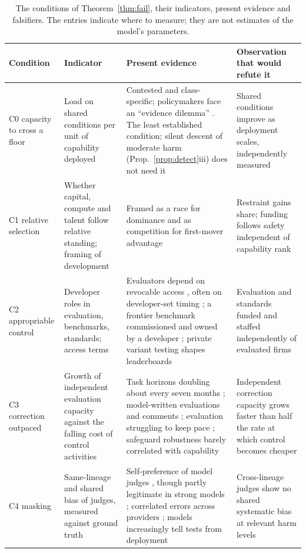 \documentclass[letterpaper]{article} %
\theoremstyle{definition}
\begin{document}
\begin{table}[t]
\centering
\small
\setlength{\tabcolsep}{4pt}
\begin{tabular}{@{}>{\raggedright\arraybackslash}p{2.6cm}>{\raggedright\arraybackslash}p{4.2cm}>{\raggedright\arraybackslash}p{5.6cm}>{\raggedright\arraybackslash}p{4.4cm}@{}}
\toprule
Condition & Indicator & Present evidence & Observation that would refute it \\
\midrule
C0 capacity to cross a floor & Load on shared conditions per unit of capability deployed & Contested and class-specific; policymakers face an ``evidence dilemma'' \citep{bengio2025report}. The least established condition; silent descent of moderate harm (Prop.~\ref{prop:detect}iii) does not need it & Shared conditions improve as deployment scales, independently measured \\
C1 relative selection & Whether capital, compute and talent follow relative standing; framing of development & Framed as a race for dominance \citep{whitehouse2025} and as competition for first-mover advantage \citep{statecouncil2017} & Restraint gains share; funding follows safety independent of capability rank \\
C2 appropriable control & Developer roles in evaluation, benchmarks, standards; access terms & Evaluators depend on revocable access \citep{longpre2024}, often on developer-set timing \citep{metr2025o3}; a frontier benchmark commissioned and owned by a developer \citep{besiroglu2025frontiermath}; private variant testing shapes leaderboards \citep{singh2025} & Evaluation and standards funded and staffed independently of evaluated firms \\
C3 correction outpaced & Growth of independent evaluation capacity against the falling cost of control activities & Task horizons doubling about every seven months \citep{kwa2025}; model-written evaluations and comments \citep{perez2023,weiss2019}; evaluation struggling to keep pace \citep{bengio2025report}; safeguard robustness barely correlated with capability \citep{aisi2025trends} & Independent correction capacity grows faster than half the rate at which control becomes cheaper \\
C4 masking & Same-lineage and shared bias of judges, measured against ground truth & Self-preference of model judges \citep{panickssery2024,chen2025selfpref}, though partly legitimate in strong models \citep{chen2025reason}; correlated errors across providers \citep{kim2025,goel2025}; models increasingly tell tests from deployment \citep{bengio2026report} & Cross-lineage judges show no shared systematic bias at relevant harm levels \\
\bottomrule
\end{tabular}
\caption{The conditions of Theorem~\ref{thm:fail}, their indicators, present evidence and falsifiers. The entries indicate where to measure; they are not estimates of the model's parameters.}
\label{tab:evidence}
\end{table}
\end{document}
